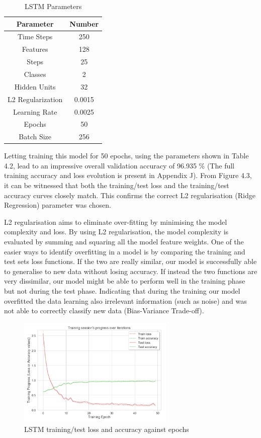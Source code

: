 {
\begin{table}[h!]
\centering
\begin{tabular}{|c|c|}
\hline
Parameter &Number \\
\hline
Time Steps & 250  \\
Features & 128  \\
Steps & 25  \\
Classes & 2 \\
Hidden Units & 32 \\
L2 Regularization & 0.0015 \\
Learning Rate & 0.0025 \\
Epochs & 50 \\
Batch Size & 256 \\
\hline
\end{tabular}
\caption{LSTM Parameters}
\label{table:1}
\end{table}
}


Letting training this model for 50 epochs, using the parameters shown in Table 4.2, lead to an impressive overall validation accuracy of 96.935 \% (The full training accuracy and loss evolution is present in Appendix J). From Figure 4.3, it can be witnessed that both the training/test loss and the training/test accuracy curves closely match. This confirms the correct L2 regularisation (Ridge Regression) parameter was chosen. 

L2 regularisation aims to eliminate over-fitting by minimising the model complexity and loss. By using L2 regularisation, the model complexity is evaluated by summing and squaring all the model feature weights. One of the easier ways to identify overfitting in a model is by comparing the training and test sets loss functions. If the two are really similar, our model is successfully able to generalise to new data without losing accuracy. If instead the two functions are very dissimilar, our model might be able to perform well in the training phase but not during the test phase. Indicating that during the training our model overfitted the data learning also irrelevant information (such as noise) and was not able to correctly classify new data (Bias-Variance Trade-off). 


\begin{figure}[ht!]%
    \centering
    \includegraphics[width=7.5cm]{images/LSTMplot.PNG}%
    \caption{LSTM training/test loss and accuracy against epochs}
\end{figure}

